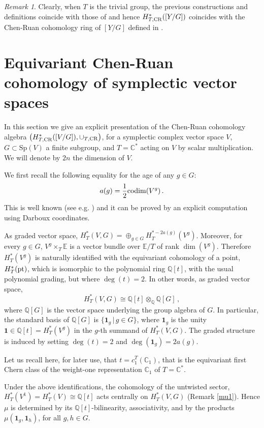 \documentclass[a4paper,reqno]{amsart}
\theoremstyle{plain} %
\theoremstyle{definition} %
\theoremstyle{remark} %
\newtheorem{rmk}[thm]{Remark}
\newcommand{\E}{\mathbb{E}}
\newcommand{\Q}{\mathbb{Q}}
\newcommand{\C}{\mathbb{C}}
\newcommand{\fo}{\mathbf{1}}
\newcommand{\1}{\mathds{1}}   %
\begin{document}
\begin{rmk}
Clearly, when $T$ is the trivial group,  the previous constructions and definitions coincide with those 
of \cite{FG03} and hence $H^*_{T, {\rm CR}}([Y/G])$ coincides with the Chen-Ruan cohomology ring of $[Y/G]$
defined in \cite{CR04}.
\end{rmk}

\section{Equivariant Chen-Ruan cohomology of symplectic vector spaces}\label{Section_ECRSympl}
In this section we give an explicit presentation of the Chen-Ruan cohomology 
algebra $\left( H^*_{T, {\rm CR}}([V/G]), \cup_{T, {\rm CR}} \right)$,
for a symplectic complex vector space $V$, $G \subset \mathrm{Sp}(V)$ a finite subgroup, 
and $T=\C^*$ acting on $V$ by scalar multiplication.
We will denote by $2n$ the dimension of $V$. 

We first recall the following equality for the age of any $g\in G$:
$$
a(g)= \frac{1}{2}{\rm codim}(V^g) \, .
$$
This is well known (see e.g. \cite{GK}) and it can be proved by an explicit computation using Darboux coordinates.

As graded vector space, $H_T^*(V, G) = \oplus_{g\in G} H_T^{*-2a(g)}(V^g)$. 
Moreover, for every $g\in G$, $V^g\times_T \E$ is a vector bundle over $\E/T$
of rank  $\dim (V^g)$. Therefore $H_T^*(V^g)$ is naturally identified with
the equivariant cohomology of a point,  $H^*_T({\rm pt})$, which is isomorphic to the polynomial ring $\Q[t]$,
with the usual polynomial grading, but where $\deg (t)=2$. In other words, as graded vector space, 
\begin{equation}\label{HTVG}
H_T^*(V, G) \cong \Q[t] \otimes_\Q \Q[G] \, ,
\end{equation}
where $\Q[G]$ is the vector space underlying the group algebra of $G$.
In particular,  the standard basis of $\Q[G]$ is  $\{ \fo_g \, | \, g \in G \}$,
where $\fo_g$ is the unity $\fo \in \Q[t] =H^*_T(V^g)$ in the $g$-th summand of  $H_T^*(V, G)$.
The graded structure is induced by setting $\deg (t)=2$ and $\deg (\fo_g) = 2a(g)$.

Let us recall here, for later use, that $t =c_1^T(\C_1)$, that is the equivariant first Chern class of 
the weight-one representation $\C_1$ of $T=\C^*$.

Under the above identifications, the cohomology of the untwisted sector, $H^*_T(V^1)=H^*_T(V) \cong \Q[t]$ acts centrally on 
$H^*_T(V,G)$ (Remark \ref{mu1}). Hence $\mu$ is determined by its $\Q[t]$-bilinearity, associativity, and by the products 
$\mu (\mathbf{1}_g, \mathbf{1}_h)$, for all $g, h \in G$.
\end{document}
